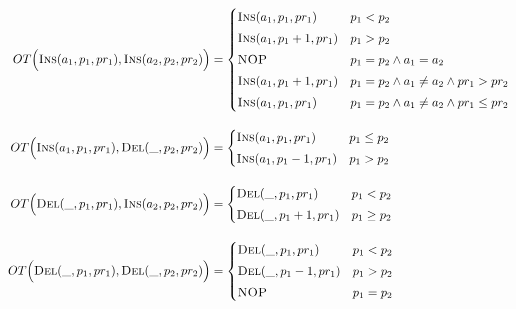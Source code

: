 
\newcommand{\ldel}{\textsc{Del}}	%
\newcommand{\lins}{\textsc{Ins}}	%
\newcommand{\ldelop}[2]{\ldel\left(#1, #2\right)}  %
\newcommand{\linsop}[3]{\lins\left(#1, #2, #3\right)}  %

\begin{align*}
  OT\Big(\lins(a_1, p_1, pr_1), \lins(a_2, p_2, pr_2)\Big) &= \begin{cases}
    \lins(a_1, p_1, pr_1) 		& p_1 < p_2 \\[3pt]
    \lins(a_1, p_1 + 1, pr_1) 		& p_1 > p_2 \\[3pt]
    \textsc{NOP} 			& p_1 = p_2 \land a_1 = a_2 \\[3pt]
    \lins(a_1, p_1 + 1, pr_1) 		& p_1 = p_2 \land a_1 \neq a_2 \land pr_1 > pr_2 \\[3pt]
    \lins(a_1, p_1, pr_1)		& p_1 = p_2 \land a_1 \neq a_2 \land pr_1 \le pr_2
  \end{cases} \\[10pt]
  OT\Big(\lins(a_1, p_1, pr_1), \ldel(\_, p_2, pr_2)\Big) &= \begin{cases}
    \lins(a_1, p_1, pr_1) 		& p_1 \le p_2 \\[3pt]
    \lins(a_1, p_1 - 1, pr_1) 		& p_1 > p_2
  \end{cases} \\[10pt]
  OT\Big(\ldel(\_, p_1, pr_1), \lins(a_2, p_2, pr_2)\Big) &= \begin{cases}
    \ldel(\_, p_1, pr_1) 		& p_1 < p_2 \\[3pt]
    \ldel(\_, p_1 + 1, pr_1) 		& p_1 \ge p_2
  \end{cases} \\[10pt]
  OT\Big(\ldel(\_, p_1, pr_1), \ldel(\_, p_2, pr_2)\Big) &= \begin{cases}
    \ldel(\_, p_1, pr_1) 		& p_1 < p_2 \\[3pt]
    \ldel(\_, p_1 - 1, pr_1) 		& p_1 > p_2 \\[3pt]
    \textsc{NOP}			& p_1 = p_2
  \end{cases} \\
\end{align*}
